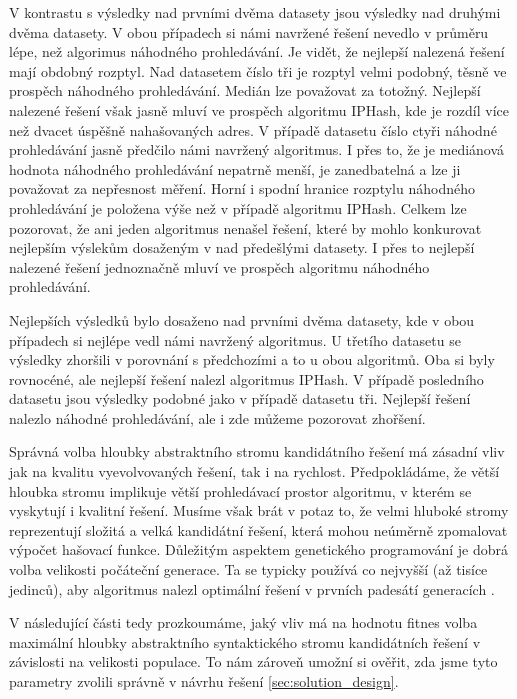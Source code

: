 V kontrastu s výsledky nad prvními dvěma datasety jsou výsledky nad druhými dvěma datasety. V obou případech
si námi navržené řešení nevedlo v průměru lépe, než algorimus náhodného prohledávání. Je vidět, že nejlepší
nalezená řešení mají obdobný rozptyl. Nad datasetem číslo tři je rozptyl velmi podobný, těsně ve prospěch 
náhodného prohledávání. Medián lze považovat za totožný. Nejlepší nalezené řešení však jasně mluví ve prospěch
algoritmu IPHash, kde je rozdíl více než dvacet úspěšně nahašovaných adres. V případě datasetu číslo ctyři náhodné
prohledávání jasně předčilo námi navržený algoritmus. I přes to, že je mediánová hodnota náhodného prohledávání
nepatrně menší, je zanedbatelná a lze ji považovat za nepřesnost měření. Horní i spodní hranice rozptylu náhodného
prohledávání je položena výše než v případě algoritmu IPHash. Celkem lze pozorovat, že ani jeden algoritmus 
nenašel řešení, které by mohlo konkurovat nejlepším výslekům dosaženým v nad předešlými datasety. I přes to
nejlepší nalezené řešení jednoznačně mluví ve prospěch algoritmu náhodného prohledávání.

Nejlepších výsledků bylo dosaženo nad prvními dvěma datasety, kde v obou případech si nejlépe vedl námi navržený
algoritmus. U třetího datasetu se výsledky zhoršili v porovnání s předchozími a to u obou algoritmů. Oba si byly 
rovnocéné, ale nejlepší řešení nalezl algoritmus IPHash. V případě posledního datasetu jsou výsledky podobné jako
v případě datasetu tři. Nejlepší řešení nalezlo náhodné prohledávání, ale i zde můžeme pozorovat zhořšení. 

Správná volba hloubky abstraktního stromu kandidátního řešení má zásadní vliv jak na kvalitu vyevolvovaných řešení,
tak i na rychlost. Předpokládáme, že větší hloubka stromu implikuje větší prohledávací prostor algoritmu, v kterém
se vyskytují i kvalitní řešení. Musíme však brát v potaz to, že velmi hluboké stromy reprezentují složitá a velká kandidátní
řešení, která mohou neúměrně zpomalovat výpočet hašovací funkce. Důležitým aspektem genetického programování je 
dobrá volba velikosti počáteční generace. Ta se typicky používá co nejvyšší (až tisíce jedinců), aby algoritmus nalezl
optimální řešení v prvních padesátí generacích \cite{GPTutorial}.

V následující části tedy prozkoumáme, jaký vliv má na hodnotu fitnes volba maximální hloubky abstraktního syntaktického
stromu kandidátních řešení v závislosti na velikosti populace. To nám zároveň umožní si ověřit, zda jsme tyto parametry
zvolili správně v návrhu řešení \ref{sec:solution_design}.

